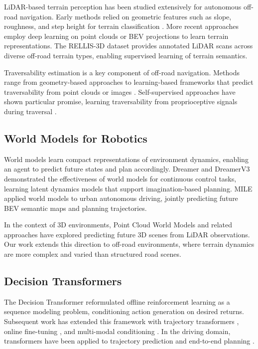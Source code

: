 \documentclass[sensors,article,submit,pdftex,moreauthors]{Definitions/mdpi}
\begin{document}
LiDAR-based terrain perception has been studied extensively for autonomous off-road navigation. Early methods relied on geometric features such as slope, roughness, and step height for terrain classification \cite{papadakis2013}. More recent approaches employ deep learning on point clouds \cite{qi2017, qi2017b} or BEV projections \cite{zhou2018, lang2019} to learn terrain representations. The RELLIS-3D dataset \cite{jiang2021} provides annotated LiDAR scans across diverse off-road terrain types, enabling supervised learning of terrain semantics.

Traversability estimation is a key component of off-road navigation. Methods range from geometry-based approaches \cite{sock2016} to learning-based frameworks that predict traversability from point clouds or images \cite{wellhausen2019, frey2023}. Self-supervised approaches have shown particular promise, learning traversability from proprioceptive signals during traversal \cite{castro2023, frey2024}. 

\subsection{World Models for Robotics}
World models learn compact representations of environment dynamics, enabling an agent to predict future states and plan accordingly. Dreamer \cite{hafner2020} and DreamerV3 \cite{hafner2023} demonstrated the effectiveness of world models for continuous control tasks, learning latent dynamics models that support imagination-based planning. MILE \cite{hu2022} applied world models to urban autonomous driving, jointly predicting future BEV semantic maps and planning trajectories.

In the context of 3D environments, Point Cloud World Models \cite{yang2023} and related approaches have explored predicting future 3D scenes from LiDAR observations. Our work extends this direction to off-road environments, where terrain dynamics are more complex and varied than structured road scenes.

\subsection{Decision Transformers}
The Decision Transformer \cite{chen2021} reformulated offline reinforcement learning as a sequence modeling problem, conditioning action generation on desired returns. Subsequent work has extended this framework with trajectory transformers \cite{janner2021}, online fine-tuning \cite{zheng2022}, and multi-modal conditioning \cite{xu2022}. In the driving domain, transformers have been applied to trajectory prediction \cite{nayakanti2023} and end-to-end planning \cite{hu2023}.
\end{document}
